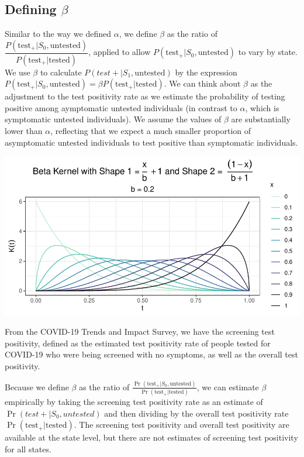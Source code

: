 \documentclass[12pt,twoside]{smiththesis}
\begin{document}
\hypertarget{defining-beta}{%
\subsection{\texorpdfstring{Defining \(\beta\)}{Defining \textbackslash beta}}\label{defining-beta}}

Similar to the way we defined \(\alpha\), we define \(\beta\) as the ratio of \(\dfrac{P(\text{test}_+ |S_0, \text{untested})}{P(\text{test}_+|\text{tested})}\), applied to allow \(P(\text{test}_+ |S_0, \text{untested})\) to vary by state. We use \(\beta\) to calculate \(P(test+|S_1, \text{untested})\) by the expression \(P(\text{test}_+|S_0, \text{untested}) =\beta P(\text{test}_+|\text{tested})\). We can think about \(\beta\) as the adjustment to the test positivity rate as we estimate the probability of testing positive among aymptomatic untested individuals (in contrast to \(\alpha\), which is symptomatic untested individuals). We assume the values of \(\beta\) are substantially lower than \(\alpha\), reflecting that we expect a much smaller proportion of asymptomatic untested individuals to test positive than symptomatic individuals.
\begin{center}\includegraphics[width=0.8\linewidth]{thesis_files/figure-latex/unnamed-chunk-45-1} \end{center}

From the COVID-19 Trends and Impact Survey, we have the screening test positivity, defined as the estimated test positivity rate of people tested for COVID-19 who were being screened with no symptoms, as well as the overall test positivity.

Because we define \(\beta\) as the ratio of \(\frac{\Pr(\text{test}_+ |S_0, \text{untested})}{\Pr(\text{test}_+|\text{tested})}\), we can estimate \(\beta\) empirically by taking the screening test positivity rate as an estimate of \(\Pr(test + |S_0, untested)\) and then dividing by the overall test positivity rate \(\Pr(\text{test}_+|\text{tested})\). The screening test positivity and overall test positivity are available at the state level, but there are not estimates of screening test positivity for all states.
\end{document}
